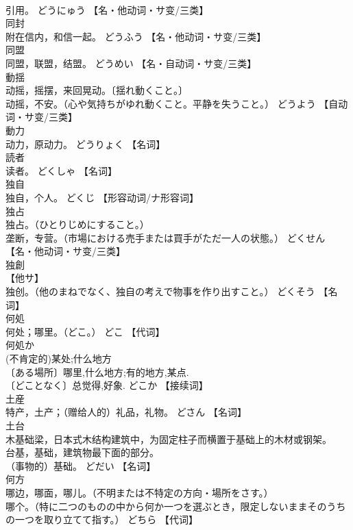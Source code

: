 \documentclass[8pt]{extreport}
\begin{document}
\begin{CJK}{UTF8}{min}
\\	引用。	どうにゅう		【名・他动词・サ变/三类】
\\	同封	
\\	附在信内，和信一起。	どうふう		【名・他动词・サ变/三类】
\\	同盟	
\\	同盟，联盟，结盟。	どうめい		【名・自动词・サ变/三类】
\\	動揺	
\\	动摇，摇摆，来回晃动。〔揺れ動くこと。〕 
\\	动摇，不安。（心や気持ちがゆれ動くこと。平静を失うこと。）	どうよう		【自动词・サ变/三类】
\\	動力	
\\	动力，原动力。	どうりょく		【名词】
\\	読者	
\\	读者。	どくしゃ		【名词】
\\	独自	
\\	独自，个人。	どくじ		【形容动词/ナ形容词】
\\	独占	
\\	独占。（ひとりじめにすること。） 
\\	垄断，专营。（市場における売手または買手がただ一人の状態。）	どくせん		【名・他动词・サ变/三类】
\\	独創	
\\	【他サ】 
\\	独创。（他のまねでなく、独自の考えで物事を作り出すこと。）	どくそう		【名词】
\\	何処	
\\	何处；哪里。（どこ。）	どこ		【代词】
\\	何処か	
\\	(不肯定的)某处;什么地方 
\\	〔ある場所〕哪里,什么地方;有的地方,某点. 
\\	〔どことなく〕总觉得,好象.	どこか		【接续词】
\\	土産	
\\	特产，土产；（赠给人的）礼品，礼物。	どさん		【名词】
\\	土台	
\\	木基础梁，日本式木结构建筑中，为固定柱子而横置于基础上的木材或钢架。 
\\	台基，基础，建筑物最下面的部分。 
\\	（事物的）基础。	どだい		【名词】
\\	何方	
\\	哪边，哪面，哪儿。（不明または不特定の方向・場所をさす。） 
\\	哪个。（特に二つのものの中から何か一つを選ぶとき，限定しないままそのうちの一つを取り立てて指す。）	どちら		【代词】

\end{CJK}
\end{document}
